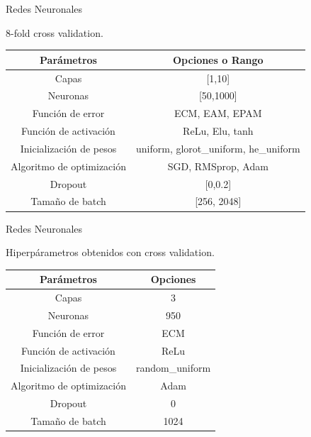 \documentclass{beamer}
\begin{document}
\begin{frame}{Redes Neuronales}
    
  8-fold cross validation.

    \begin{table}[h!]
    \begin{center}


        \begin{tabular}{c|c}
        \hline

        Par\'ametros & Opciones o Rango  \\ \hline
        Capas & [1,10]    \\ 
        Neuronas & [50,1000]  \\ 
        Funci\'on de error & ECM, EAM, EPAM  \\ 
        Funci\'on de activaci\'on & ReLu, Elu, tanh  \\ 
        Inicializaci\'on de pesos & uniform, glorot\_uniform, he\_uniform  \\ 
        Algoritmo de optimizaci\'on & SGD, RMSprop, Adam  \\ 
        Dropout & [0,0.2]  \\ 
        Tama\~no de batch & [256, 2048] \\
        \hline
        \end{tabular}
    \end{center}
    \end{table}

\end{frame}


\begin{frame}{Redes Neuronales}

    Hiperp\'arametros obtenidos con cross validation.

    \begin{table}[]
    \begin{center}
    
        \begin{tabular}{c|c}
        \hline

        Par\'ametros & Opciones  \\ \hline
        Capas & 3   \\ 
        Neuronas & 950  \\  
        Funci\'on de error & ECM  \\ 
        Funci\'on de activaci\'on & ReLu  \\ 
        Inicializaci\'on de pesos &  random\_uniform \\ 
        Algoritmo de optimizaci\'on & Adam  \\ 
        Dropout & 0  \\ 
        Tama\~no de batch &  1024 \\
        \hline
        \end{tabular}
    \end{center}
    \end{table}


\end{frame}
\end{document}
